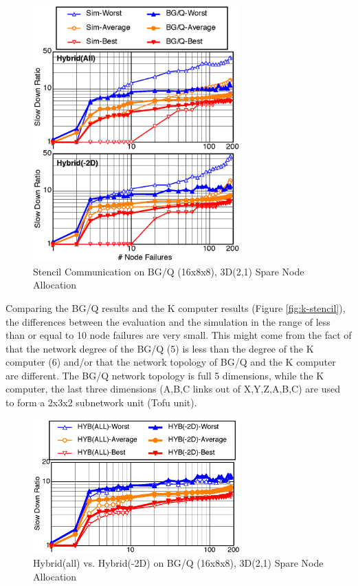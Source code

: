 \documentclass[Afour,times,sageh]{sagej}
\begin{document}
\begin{figure}[ht]
\centering
\includegraphics[width=80mm]{Figs/BGQ-Stencil-CL.eps}
  \caption{Stencil Communication on BG/Q (16x8x8), 3D(2,1) Spare Node
    Allocation}
  \label{fig:bgq-stencil}
\end{figure}

Comparing the BG/Q results and the K computer results (Figure
\ref{fig:k-stencil}), the differences between the evaluation and the
simulation in the range of less than or equal to 10 node failures are
very small. This might come from the fact of that the network degree
of the BG/Q (5) is less than the degree of the K computer (6) and/or
that the network topology of BG/Q and the K computer are different.
The BG/Q network topology is full 5 dimensions, while the K computer,
the last three dimensions (A,B,C links out of X,Y,Z,A,B,C) are used to
form a 2x3x2 subnetwork unit (Tofu unit).

\begin{figure}[ht]
\centering
\includegraphics[width=80mm]{Figs/BGQ-comparison-CL.eps}
  \caption{Hybrid(all) vs. Hybrid(-2D) on BG/Q (16x8x8), 3D(2,1) Spare
    Node Allocation}
  \label{fig:bgq-comparison}
\end{figure}
\end{document}
